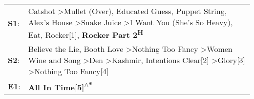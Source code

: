\begin{supertabular}{p{0.03\textwidth}p{0.92\textwidth}}
 \textbf{S1}:  &  Catshot\textsuperscript{} \textgreater \enspace Mullet (Over)\textsuperscript{}, \enspace Educated Guess\textsuperscript{}, \enspace Puppet String\textsuperscript{}, \enspace Alex's House\textsuperscript{} \textgreater \enspace Snake Juice\textsuperscript{} \textgreater \enspace I Want You (She's So Heavy)\textsuperscript{}, \enspace Eat\textsuperscript{}, \enspace Rocker[1]\textsuperscript{}, \enspace \textbf{Rocker Part 2\textsuperscript{H}}  \enspace  \\
 \textbf{S2}:  &         Believe the Lie\textsuperscript{}, \enspace Booth Love\textsuperscript{} \textgreater \enspace Nothing Too Fancy\textsuperscript{} \textgreater \enspace Women Wine and Song\textsuperscript{} \textgreater \enspace Den\textsuperscript{} \textgreater \enspace Kashmir\textsuperscript{}, \enspace Intentions Clear[2]\textsuperscript{} \textgreater \enspace Glory[3]\textsuperscript{} \textgreater \enspace Nothing Too Fancy[4]\textsuperscript{}  \enspace  \\
 \textbf{E1}:  &                                                                                                                                                                                                                                                                                                                                                                                                               \textbf{All In Time[5]\textsuperscript{$\wedge$*}}  \enspace  \\
\end{supertabular}
